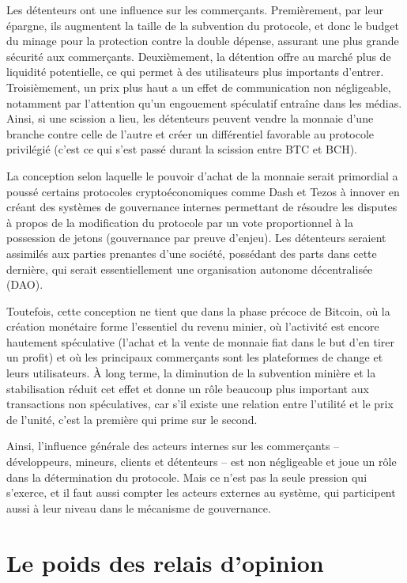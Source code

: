 Les détenteurs ont une influence sur les commerçants. Premièrement, par leur épargne, ils augmentent la taille de la subvention du protocole, et donc le budget du minage pour la protection contre la double dépense, assurant une plus grande sécurité aux commerçants. Deuxièmement, la détention offre au marché plus de liquidité potentielle, ce qui permet à des utilisateurs plus importants d'entrer. Troisièmement, un prix plus haut a un effet de communication non négligeable, notamment par l'attention qu'un engouement spéculatif entraîne dans les médias. Ainsi, si une scission a lieu, les détenteurs peuvent vendre la monnaie d'une branche contre celle de l'autre et créer un différentiel favorable au protocole privilégié (c'est ce qui s'est passé durant la scission entre BTC et BCH).

La conception selon laquelle le pouvoir d'achat de la monnaie serait primordial a poussé certains protocoles cryptoéconomiques comme Dash et Tezos à innover en créant des systèmes de gouvernance internes permettant de résoudre les disputes à propos de la modification du protocole par un vote proportionnel à la possession de jetons (gouvernance par preuve d'enjeu). Les détenteurs seraient assimilés aux parties prenantes d'une société, possédant des parts dans cette dernière, qui serait essentiellement une organisation autonome décentralisée (DAO).

Toutefois, cette conception ne tient que dans la phase précoce de Bitcoin, où la création monétaire forme l'essentiel du revenu minier, où l'activité est encore hautement spéculative (l'achat et la vente de monnaie fiat dans le but d'en tirer un profit) et où les principaux commerçants sont les plateformes de change et leurs utilisateurs. À long terme, la diminution de la subvention minière et la stabilisation réduit cet effet et donne un rôle beaucoup plus important aux transactions non spéculatives, car s'il existe une relation entre l'utilité et le prix de l'unité, c'est la première qui prime sur le second.

Ainsi, l'influence générale des acteurs internes sur les commerçants -- développeurs, mineurs, clients et détenteurs -- est non négligeable et joue un rôle dans la détermination du protocole. Mais ce n'est pas la seule pression qui s'exerce, et il faut aussi compter les acteurs externes au système, qui participent aussi à leur niveau dans le mécanisme de gouvernance.

\section*{Le poids des relais d'opinion} %

